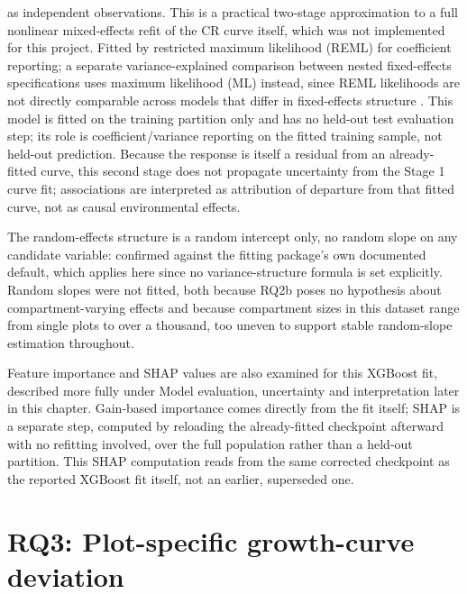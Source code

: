 \documentclass[11pt,a4paper]{report}
\begin{document}
\begin{itemize}
  as independent observations. This is a practical two-stage approximation to a full nonlinear
  mixed-effects refit of the CR curve itself, which was not implemented for this project. Fitted
  by restricted maximum likelihood (REML) for coefficient reporting; a separate variance-explained
  comparison between nested fixed-effects specifications uses maximum likelihood (ML) instead,
  since REML likelihoods are not directly comparable across models that differ in fixed-effects
  structure \citep{pinheiro2000}. %
  This model is fitted on the training partition only and has no held-out test evaluation step;
  its role is coefficient/variance reporting on the fitted training sample, not held-out
  prediction. Because the response is itself a residual from an already-fitted curve, this second
  stage does not propagate uncertainty from the Stage 1 curve fit; associations are interpreted as
  attribution of departure from that fitted curve, not as causal environmental effects.

  The random-effects structure is a random intercept only, no random slope on any candidate
  variable: confirmed against the fitting package's own documented default, which applies here
  since no variance-structure formula is set explicitly. Random slopes were not fitted, both
  because RQ2b poses no hypothesis about compartment-varying effects and because compartment
  sizes in this dataset range from single plots to over a thousand, too uneven to support stable
  random-slope estimation throughout.
\end{itemize}

Feature importance and SHAP values are also examined for this XGBoost fit, described more fully
under Model evaluation, uncertainty and interpretation later in this chapter. Gain-based
importance comes directly from the fit itself; SHAP is a separate step, computed by reloading the
already-fitted checkpoint afterward with no refitting involved, over the full population rather
than a held-out partition. This SHAP computation reads from the same corrected checkpoint as the
reported XGBoost fit itself, not an earlier, superseded one.

\section{RQ3: Plot-specific growth-curve deviation}
\end{document}
